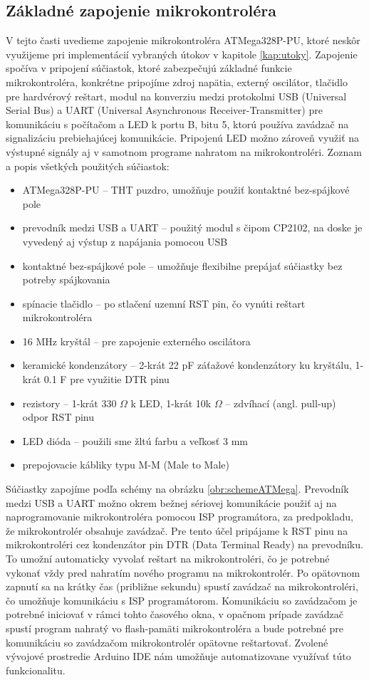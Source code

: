 \subsection{Základné zapojenie mikrokontroléra} \label{kap2:sek:zakladneZapojenie}
V tejto časti uvedieme zapojenie mikrokontroléra ATMega328P-PU, ktoré neskôr využijeme pri implementácií vybraných útokov v kapitole \ref{kap:utoky}. Zapojenie spočíva v pripojení súčiastok, ktoré zabezpečujú základné funkcie mikrokontroléra, konkrétne pripojíme zdroj napätia, externý oscilátor, tlačidlo pre hardvérový reštart, modul na konverziu medzi protokolmi USB (Universal Serial Bus) a UART (Universal Asynchronous Receiver-Transmitter) pre komunikáciu s počítačom a LED k portu B, bitu 5, ktorú používa zavádzač na signalizáciu prebiehajúcej komunikácie. Pripojenú LED možno zároveň využiť na výstupné signály aj v samotnom programe nahratom na mikrokontroléri. Zoznam a popis všetkých použitých súčiastok:
\begin{itemize}
    \item ATMega328P-PU -- THT puzdro, umožňuje použiť kontaktné bez-spájkové pole
    \item prevodník medzi USB a UART -- použitý modul s čipom CP2102, na doske je vyvedený aj výstup z napájania pomocou USB
    \item kontaktné bez-spájkové pole -- umožňuje flexibilne prepájať súčiastky bez potreby spájkovania
    \item spínacie tlačidlo -- po stlačení uzemní RST pin, čo vynúti reštart mikrokontroléra
    \item 16 MHz kryštál -- pre zapojenie externého oscilátora
    \item keramické kondenzátory -- 2-krát 22 pF záťažové kondenzátory ku kryštálu, 1-krát 0.1 \textmu F pre využitie DTR pinu
    \item rezistory -- 1-krát 330 $\Omega$ k LED, 1-krát 10k $\Omega$ -- zdvíhací (angl. pull-up) odpor RST pinu
    \item LED dióda -- použili sme žltú farbu a veľkosť 3 mm
    \item prepojovacie kábliky typu M-M (Male to Male)
\end{itemize}
Súčiastky zapojíme podľa schémy na obrázku \ref{obr:schemeATMega}. Prevodník medzi USB a UART možno okrem bežnej sériovej komunikácie použiť aj na naprogramovanie mikrokontroléra pomocou ISP programátora, za predpokladu, že mikrokontrolér obsahuje zavádzač. Pre tento účel pripájame k RST pinu na mikrokontroléri cez kondenzátor pin DTR (Data Terminal Ready) na prevodníku. To umožní automaticky vyvolať reštart na mikrokontroléri, čo je potrebné vykonať vždy pred nahratím nového programu na mikrokontrolér. Po opätovnom zapnutí sa na krátky čas (približne sekundu) spustí zavádzač na mikrokontroléri, čo umožňuje komunikáciu s ISP programátorom. Komunikáciu so zavádzačom je potrebné iniciovať v rámci tohto časového okna, v opačnom prípade zavádzač spustí program nahratý vo flash-pamäti mikrokontroléra a bude potrebné pre komunikáciu so zavádzačom mikrokontrolér opätovne reštartovať. Zvolené vývojové prostredie Arduino IDE nám umožňuje automatizovane využívať túto funkcionalitu.

